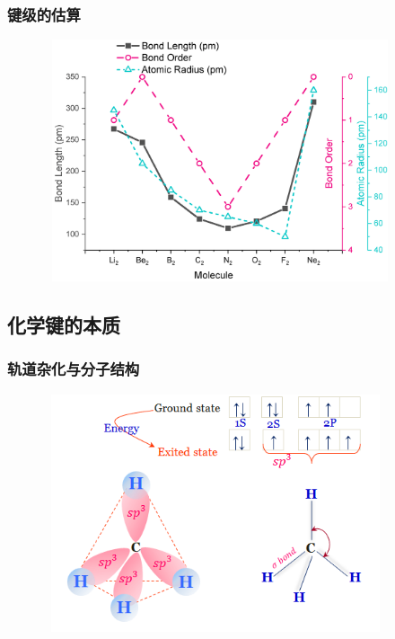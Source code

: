 \frame
{
	\frametitle{键级的估算}
\begin{figure}[h!]
\centering
\vspace{-15.5pt}
\includegraphics[height=2.80in,width=4.10in,viewport=0 0 800 550,clip]{Figures/Band-order-2.jpg}
\label{Bond_Order-2}
\end{figure}
}

\subsection{化学键的本质}
\frame
{
	\frametitle{轨道杂化与分子结构}
\begin{figure}[h!]
\centering
\vspace{-10.5pt}
\includegraphics[height=2.75in,width=4.00in,viewport=0 0 520 370,clip]{Figures/methane-gas.png}
\label{Bond_Hybrid}
\end{figure}
}

